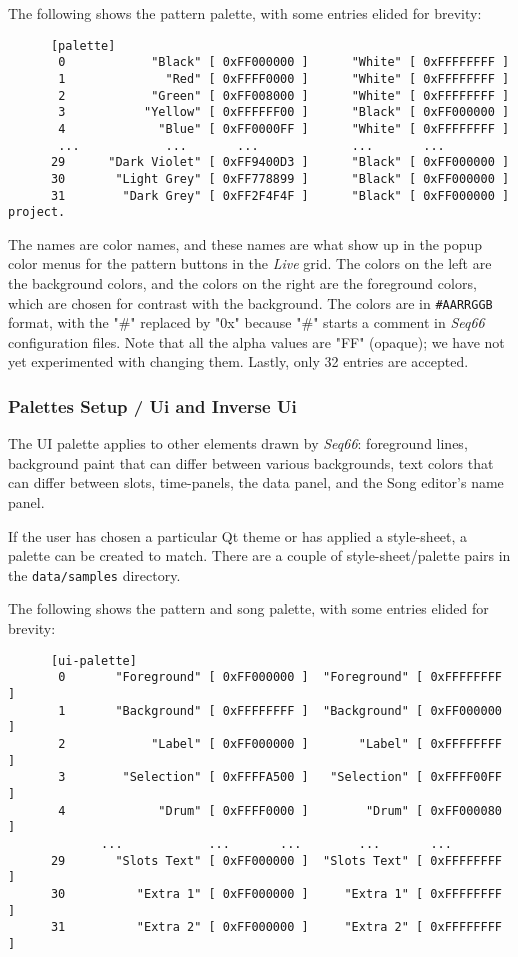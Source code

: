    The following shows the pattern palette, with some entries elided for
   brevity:

   \begin{verbatim}
      [palette]
       0            "Black" [ 0xFF000000 ]      "White" [ 0xFFFFFFFF ]
       1              "Red" [ 0xFFFF0000 ]      "White" [ 0xFFFFFFFF ]
       2            "Green" [ 0xFF008000 ]      "White" [ 0xFFFFFFFF ]
       3           "Yellow" [ 0xFFFFFF00 ]      "Black" [ 0xFF000000 ]
       4             "Blue" [ 0xFF0000FF ]      "White" [ 0xFFFFFFFF ]
       ...            ...       ...             ...       ...
      29      "Dark Violet" [ 0xFF9400D3 ]      "Black" [ 0xFF000000 ]
      30       "Light Grey" [ 0xFF778899 ]      "Black" [ 0xFF000000 ]
      31        "Dark Grey" [ 0xFF2F4F4F ]      "Black" [ 0xFF000000 ]
project.
   \end{verbatim}

   The names are color names, and these names are what show up in the popup
   color menus for the pattern buttons in the \textsl{Live} grid.
   The colors on the left are the background colors, and the colors on the
   right are the foreground colors, which are chosen for contrast with the
   background.  The colors are in \texttt{\#AARRGGB} format, with the "\#"
   replaced by "0x" because "\#" starts a comment in \textsl{Seq66}
   configuration files.  Note that all the alpha values are "FF" (opaque); we
   have not yet experimented with changing them.
   Lastly, only 32 entries are accepted.

\subsubsection{Palettes Setup / Ui and Inverse Ui}
\label{subsubsec:palettes_setup_ui}

   The UI palette applies to other elements drawn by \textsl{Seq66}:
   foreground lines, background paint that can differ between various
   backgrounds, text colors that can differ between slots, time-panels,
   the data panel, and the Song editor's name panel.
   
   If the user has chosen a particular Qt theme or has applied a
   style-sheet, a palette can be created to match.
   There are a couple of style-sheet/palette pairs in the
   \texttt{data/samples} directory.

   The following shows the pattern and song palette,
   with some entries elided for brevity:

   \begin{verbatim}
      [ui-palette]
       0       "Foreground" [ 0xFF000000 ]  "Foreground" [ 0xFFFFFFFF ]
       1       "Background" [ 0xFFFFFFFF ]  "Background" [ 0xFF000000 ]
       2            "Label" [ 0xFF000000 ]       "Label" [ 0xFFFFFFFF ]
       3        "Selection" [ 0xFFFFA500 ]   "Selection" [ 0xFFFF00FF ]
       4             "Drum" [ 0xFFFF0000 ]        "Drum" [ 0xFF000080 ]
             ...            ...       ...        ...       ...
      29       "Slots Text" [ 0xFF000000 ]  "Slots Text" [ 0xFFFFFFFF ]
      30          "Extra 1" [ 0xFF000000 ]     "Extra 1" [ 0xFFFFFFFF ]
      31          "Extra 2" [ 0xFF000000 ]     "Extra 2" [ 0xFFFFFFFF ]
   \end{verbatim}

